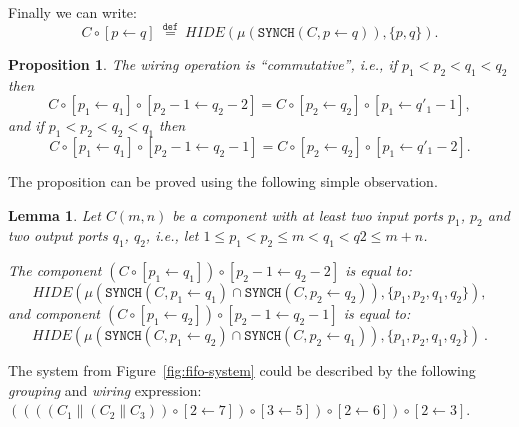 \documentclass{llncs}
\newtheorem{prop}[thm]{Proposition}
\newtheorem{lem}[thm]{Lemma}
\newcommand{\df}[1]{\ \stackrel{\mathtt{def}}{#1}\ }
\begin{document}
Finally we can write:
\[
C\circ[p\leftarrow q] \df{=} 
\mathit{HIDE}\left(
  \mu\left(\mathtt{SYNCH}(C,p\leftarrow q) 
  \right), 
  \{p,q\}
\right).
\]

\begin{prop}\label{prop:wire-comm}
  The wiring operation is ``commutative'', i.e., if $p_1< p_2 <q_1<
  q_2$ then
  \[C\circ[p_1\leftarrow q_1] \circ [p_2-1\leftarrow q_2-2] =
  C\circ[p_2\leftarrow q_2] \circ [p_1\leftarrow q'_1-1],\] 
  and if $p_1< p_2 <q_2< q_1$ then
  \[C\circ[p_1\leftarrow q_1] \circ [p_2-1\leftarrow q_2-1] =
  C\circ[p_2\leftarrow q_2] \circ [p_1\leftarrow q'_1-2].\]
\end{prop}

The proposition can be proved using the following simple
observation.
\begin{lem}
  Let $C(m,n)$ be a component with at least two input ports $p_1$, $p_2$
  and two output ports $q_1$, $q_2$, i.e., let $1\leq p_1< p_2\leq m < q_1 <
  q2 \leq m+n$.

  The component $(C\circ[p_1\leftarrow q_1]) \circ
  [p_2-1\leftarrow q_2-2]$ is equal to:
  \[
  \mathit{HIDE}\left( \mu
    (\mathtt{SYNCH}(C,p_1\leftarrow q_1)
    \cap
    \mathtt{SYNCH}(C,p_2\leftarrow q_2)), 
    \{p_1,p_2,q_1,q_2\}
  \right),
\]
  and component $(C\circ[p_1\leftarrow q_2]) \circ
  [p_2-1\leftarrow q_2-1]$ is equal to:
  \[
  \mathit{HIDE}\left(\mu(
    \mathtt{SYNCH}(C,p_1\leftarrow   q_2)
    \cap
    \mathtt{SYNCH}(C,p_2\leftarrow q_1)),
    \{p_1,p_2,q_1,q_2\}
  \right)~.
\]
\end{lem}



The system from Figure~\ref{fig:fifo-system} could be described by the
following \emph{grouping} and \emph{wiring} expression:
$\left(\left(\left((C_1\parallel (C_2\parallel C_3)) \circ
      [2\leftarrow 7]\right) \circ [3\leftarrow 5]\right) \circ
  [2\leftarrow 6]\right) \circ [2\leftarrow 3]$.
\end{document}
